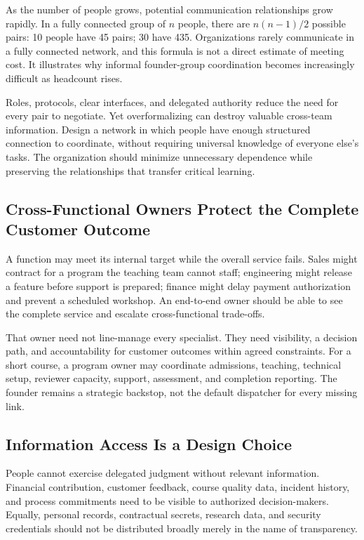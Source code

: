 As the number of people grows, potential communication relationships grow rapidly. In a fully connected group of $n$ people, there are $n(n-1)/2$ possible pairs: 10 people have 45 pairs; 30 have 435. Organizations rarely communicate in a fully connected network, and this formula is not a direct estimate of meeting cost. It illustrates why informal founder-group coordination becomes increasingly difficult as headcount rises.

Roles, protocols, clear interfaces, and delegated authority reduce the need for every pair to negotiate. Yet overformalizing can destroy valuable cross-team information. Design a network in which people have enough structured connection to coordinate, without requiring universal knowledge of everyone else's tasks. The organization should minimize unnecessary dependence while preserving the relationships that transfer critical learning.

\subsection{Cross-Functional Owners Protect the Complete Customer Outcome}
\label{sec:cross_functional_owners}

A function may meet its internal target while the overall service fails. Sales might contract for a program the teaching team cannot staff; engineering might release a feature before support is prepared; finance might delay payment authorization and prevent a scheduled workshop. An end-to-end owner should be able to see the complete service and escalate cross-functional trade-offs.

That owner need not line-manage every specialist. They need visibility, a decision path, and accountability for customer outcomes within agreed constraints. For a short course, a program owner may coordinate admissions, teaching, technical setup, reviewer capacity, support, assessment, and completion reporting. The founder remains a strategic backstop, not the default dispatcher for every missing link.

\subsection{Information Access Is a Design Choice}
\label{sec:information_access_design}

People cannot exercise delegated judgment without relevant information. Financial contribution, customer feedback, course quality data, incident history, and process commitments need to be visible to authorized decision-makers. Equally, personal records, contractual secrets, research data, and security credentials should not be distributed broadly merely in the name of transparency.

